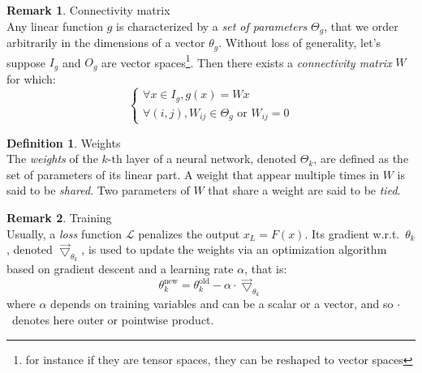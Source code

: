 \documentclass{article}
\theoremstyle{definition}
\newtheorem{definition}{Definition}[section]
\newtheorem{remark}{Remark}
\newcommand{\ovec}{}
\begin{document}
\begin{remark}{Connectivity matrix}\\
Any linear function $g$ is characterized by a \emph{set of parameters} $\Theta_g$, that we order arbitrarily in the dimensions of a vector $\theta_g$. Without loss of generality, let's suppose $I_g$ and $O_g$ are vector spaces\footnote{for instance if they are tensor spaces, they can be reshaped to vector spaces}. Then there exists a \emph{connectivity matrix} $W$ for which:
$$
\left\{
\begin{array}{l}
  \forall \ovec{x} \in I_g, g(\ovec{x}) = W\ovec{x}\\
  \forall (i,j), W_{ij} \in \Theta_g \text{ or } W_{ij} = 0
\end{array}
\right.
$$
\end{remark}

\begin{definition}{Weights}\\
The \emph{weights} of the $k$-th layer of a neural network, denoted $\Theta_k$, are defined as the set of parameters of its linear part.
A weight that appear multiple times in $W$ is said to be \emph{shared}. Two parameters of $W$ that share a weight are said to be \emph{tied}.
\end{definition}

\begin{remark}{Training}\\
Usually, a \emph{loss} function $\mathcal{L}$ penalizes the output $x_L = F(\ovec{x})$. Its gradient w.r.t.~$\theta_k$, denoted $\vec{\bigtriangledown}_{\theta_k}$, is used to update the weights via an optimization algorithm based on gradient descent and a learning rate $\alpha$, that is:
$$
\theta_k^{\text{new}} = \theta_k^{\text{old}} - \alpha \cdot \vec{\bigtriangledown}_{\theta_k}
$$
where $\alpha$ depends on training variables and can be a scalar or a vector, and so $\cdot$~denotes here outer or pointwise product.
\end{remark}
\end{document}
